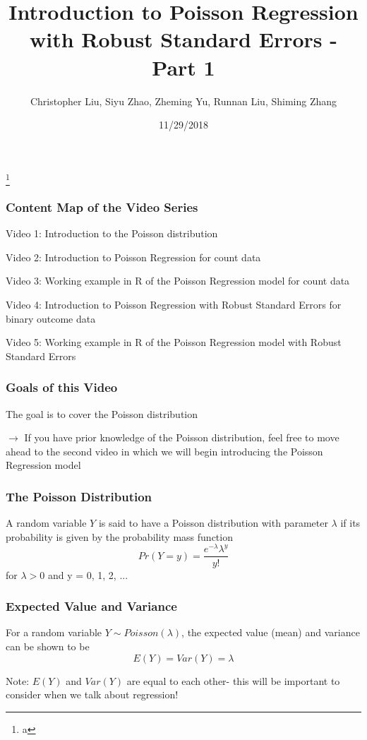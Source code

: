 \documentclass{beamer}
\title{Introduction to Poisson Regression with Robust Standard Errors - Part 1}
\author{Christopher Liu, Siyu Zhao, Zheming Yu, Runnan Liu, Shiming Zhang}
\institute{San Diego State University, Stats 610}
\date{11/29/2018}
\begin{document}
	

\begin{frame}[plain]

	\titlepage
	
	\footnote{a}

\end{frame}



\begin{frame}[fragile]\frametitle{Content Map of the Video Series}
	
	Video 1: Introduction to the Poisson distribution
	
	Video 2: Introduction to Poisson Regression for count data
		
	Video 3: Working example in R of the Poisson Regression model for count data		
		
	Video 4: Introduction to Poisson Regression with Robust Standard Errors for binary outcome data
		
	Video 5: Working example in R of the Poisson Regression model with Robust Standard Errors

\end{frame}



\begin{frame}[fragile]\frametitle{Goals of this Video}

	The goal is to cover the Poisson distribution
	
	$\rightarrow$ If you have prior knowledge of the Poisson distribution, feel free to move ahead to the second video in which we will begin introducing the Poisson Regression model

\end{frame}



\begin{frame}[fragile]\frametitle{The Poisson Distribution}

	A random variable $Y$ is said to have a Poisson distribution with parameter $\lambda$ if its probability is given by the probability mass function
	$$ Pr(Y = y) = \frac{e^{-\lambda}\lambda^{y}}{y!} $$
	for $\lambda > 0$ and y = 0, 1, 2, ...  
 

\end{frame}



\begin{frame}[fragile]\frametitle{Expected Value and Variance}

	For a random variable $Y \sim Poisson(\lambda)$, the expected value (mean) and variance can be shown to be
	$$ E(Y) = Var(Y) = \lambda $$ 
	
	Note: $E(Y)$ and $Var(Y)$ are equal to each other- this will be important to consider when we talk about regression!

\end{frame}
\end{document}
